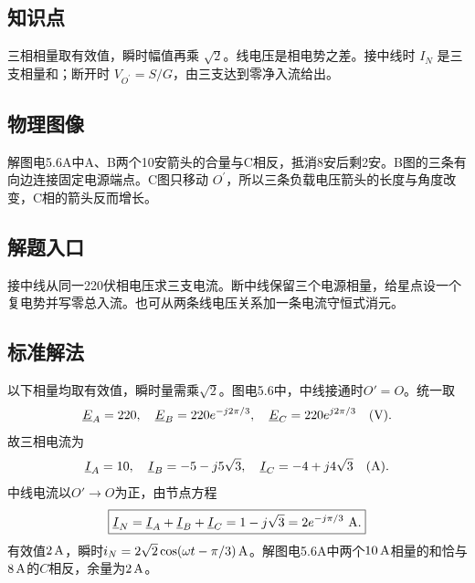 \documentclass[UTF8,fontset=fandol,a4paper,11pt]{ctexart}
\begin{document}


\subsection*{知识点}

三相相量取有效值，瞬时幅值再乘 $\sqrt2$。线电压是相电势之差。接中线时 $I_N$ 是三支相量和；断开时 $V_{O^{\prime}}=S/G$，由三支达到零净入流给出。



\subsection*{物理图像}

解图电5.6A中A、B两个10安箭头的合量与C相反，抵消8安后剩2安。B图的三条有向边连接固定电源端点。C图只移动 $O^{\prime}$，所以三条负载电压箭头的长度与角度改变，C相的箭头反而增长。



\subsection*{解题入口}

接中线从同一220伏相电压求三支电流。断中线保留三个电源相量，给星点设一个复电势并写零总入流。也可从两条线电压关系加一条电流守恒式消元。


\subsection*{标准解法}


以下相量均取有效值，瞬时量需乘$\sqrt2$。图电5.6中，中线接通时$O'=O$。统一取
\[
 \underline E_A=220,\quad\underline E_B=220e^{-j2\pi/3},
 \quad\underline E_C=220e^{j2\pi/3}\quad({\rm V}).
\]
故三相电流为
\[
 \underline I_A=10,\quad\underline I_B=-5-j5\sqrt3,\quad
 \underline I_C=-4+j4\sqrt3\quad({\rm A}).
\]
中线电流以$O'\to O$为正，由节点方程
\[
 \boxed{\underline I_N=\underline I_A+\underline I_B+\underline I_C
 =1-j\sqrt3=2e^{-j\pi/3}\ {\rm A}.}
\]
有效值$2\,{\rm A}$，瞬时$i_N=2\sqrt2\cos(\omega t-\pi/3)\,{\rm A}$。解图电5.6A中两个$10\,{\rm A}$相量的和恰与$8\,{\rm A}$的$C$相反，余量为$2\,{\rm A}$。
\end{document}
